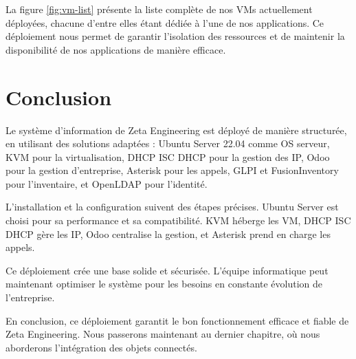 La figure \ref{fig:vm-list} présente la liste complète de nos VMs actuellement déployées, chacune d'entre elles étant dédiée à l'une de nos applications. Ce déploiement nous permet de garantir l'isolation des ressources et de maintenir la disponibilité de nos applications de manière efficace.



\section{Conclusion}

Le système d'information de Zeta Engineering est déployé de manière structurée, en utilisant des solutions adaptées : Ubuntu Server 22.04 comme OS serveur, KVM pour la virtualisation, DHCP ISC DHCP pour la gestion des IP, Odoo pour la gestion d'entreprise, Asterisk pour les appels, GLPI et FusionInventory pour l'inventaire, et OpenLDAP pour l'identité.

L'installation et la configuration suivent des étapes précises. Ubuntu Server est choisi pour sa performance et sa compatibilité. KVM héberge les VM, DHCP ISC DHCP gère les IP, Odoo centralise la gestion, et Asterisk prend en charge les appels.

Ce déploiement crée une base solide et sécurisée. L'équipe informatique peut maintenant optimiser le système pour les besoins en constante évolution de l'entreprise.

En conclusion, ce déploiement garantit le bon fonctionnement efficace et fiable de Zeta Engineering. Nous passerons maintenant au dernier chapitre, où nous aborderons l'intégration des objets connectés.




